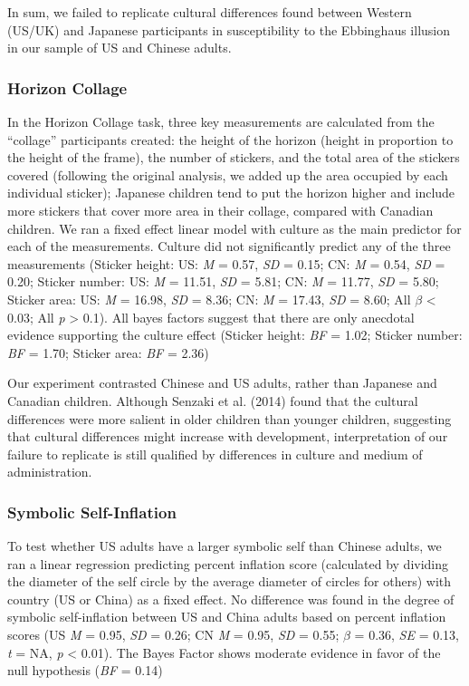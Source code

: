 \documentclass[
  man]{apa6}
\begin{document}
In sum, we failed to replicate cultural differences found between Western (US/UK) and Japanese participants in susceptibility to the Ebbinghaus illusion in our sample of US and Chinese adults.

\hypertarget{horizon-collage-1}{%
\subsubsection{Horizon Collage}\label{horizon-collage-1}}

In the Horizon Collage task, three key measurements are calculated from the ``collage'' participants created: the height of the horizon (height in proportion to the height of the frame), the number of stickers, and the total area of the stickers covered (following the original analysis, we added up the area occupied by each individual sticker); Japanese children tend to put the horizon higher and include more stickers that cover more area in their collage, compared with Canadian children. We ran a fixed effect linear model with culture as the main predictor for each of the measurements. Culture did not significantly predict any of the three measurements (Sticker height: US: \emph{M} = 0.57, \emph{SD} = 0.15; CN: \emph{M} = 0.54, \emph{SD} = 0.20; Sticker number: US: \emph{M} = 11.51, \emph{SD} = 5.81; CN: \emph{M} = 11.77, \emph{SD} = 5.80; Sticker area: US: \emph{M} = 16.98, \emph{SD} = 8.36; CN: \emph{M} = 17.43, \emph{SD} = 8.60; All \(\beta\) \textless{} 0.03; All \emph{p} \textgreater{} 0.1). All bayes factors suggest that there are only anecdotal evidence supporting the culture effect (Sticker height: \emph{BF} = 1.02; Sticker number: \emph{BF} = 1.70; Sticker area: \emph{BF} = 2.36)

Our experiment contrasted Chinese and US adults, rather than Japanese and Canadian children. Although Senzaki et al. (2014) found that the cultural differences were more salient in older children than younger children, suggesting that cultural differences might increase with development, interpretation of our failure to replicate is still qualified by differences in culture and medium of administration.

\hypertarget{symbolic-self-inflation-1}{%
\subsubsection{Symbolic Self-Inflation}\label{symbolic-self-inflation-1}}

To test whether US adults have a larger symbolic self than Chinese adults, we ran a linear regression predicting percent inflation score (calculated by dividing the diameter of the self circle by the average diameter of circles for others) with country (US or China) as a fixed effect. No difference was found in the degree of symbolic self-inflation between US and China adults based on percent inflation scores (US \emph{M} = 0.95, \emph{SD} = 0.26; CN \emph{M} = 0.95, \emph{SD} = 0.55; \(\beta\) = 0.36, \emph{SE} = 0.13, \emph{t} = NA, \emph{p} \textless{} 0.01). The Bayes Factor shows moderate evidence in favor of the null hypothesis (\emph{BF} = 0.14)
\end{document}

